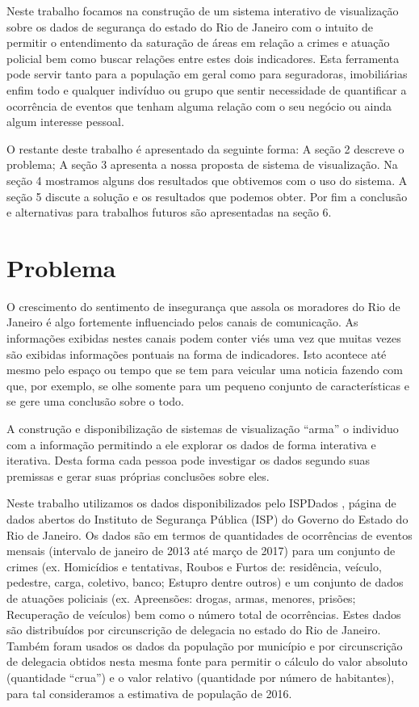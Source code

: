 \documentclass[10pt,conference]{IEEEtran}
\begin{document}
Neste trabalho focamos na construção de um sistema interativo de visualização sobre os dados de segurança do estado do Rio de Janeiro com o intuito de permitir o entendimento da saturação de áreas em relação a crimes e atuação policial bem como buscar relações entre estes dois indicadores. Esta ferramenta pode servir tanto para a população em geral como para seguradoras, imobiliárias enfim todo e qualquer indivíduo ou grupo que sentir necessidade de quantificar a ocorrência de eventos que tenham alguma relação com o seu negócio ou ainda algum interesse pessoal.

O restante deste trabalho é apresentado da seguinte forma: A seção 2 descreve o problema; A seção 3 apresenta a nossa proposta de sistema de visualização. Na seção 4 mostramos alguns dos resultados que obtivemos com o uso do sistema. A seção 5 discute a solução e os resultados que podemos obter. Por fim a conclusão e alternativas para trabalhos futuros são apresentadas na seção 6.

\section{Problema}

O crescimento do sentimento de insegurança que assola os moradores do Rio de Janeiro é algo fortemente influenciado pelos canais de comunicação. As informações exibidas nestes canais podem conter viés uma vez que muitas vezes são exibidas informações pontuais na forma de indicadores. Isto acontece até mesmo pelo espaço ou tempo que se tem para veicular uma noticia fazendo com que, por exemplo, se olhe somente para um pequeno conjunto de características e se gere uma conclusão sobre o todo.

A construção e disponibilização de sistemas de visualização “arma” o individuo com a informação permitindo a ele explorar os dados de forma interativa e iterativa. Desta forma cada pessoa pode investigar os dados segundo suas premissas e gerar suas próprias conclusões sobre eles.

Neste trabalho utilizamos os dados disponibilizados pelo ISPDados \cite{ISP2017}, página de dados abertos do Instituto de Segurança Pública (ISP) do Governo do Estado do Rio de Janeiro. Os dados são em termos de quantidades de ocorrências de eventos mensais (intervalo de janeiro de 2013 até março de 2017) para um conjunto de crimes (ex. Homicídios e tentativas, Roubos e Furtos de: residência, veículo, pedestre, carga, coletivo, banco; Estupro dentre outros) e um conjunto de dados de atuações policiais (ex. Apreensões: drogas, armas, menores, prisões; Recuperação de veículos) bem como o número total de ocorrências. Estes dados são distribuídos por circunscrição de delegacia no estado do Rio de Janeiro. Também foram usados os dados da população por município e por circunscrição de delegacia obtidos nesta mesma fonte para permitir o cálculo do valor absoluto (quantidade “crua”) e o valor relativo (quantidade por número de habitantes), para tal consideramos a estimativa de população de 2016. 
\end{document}

